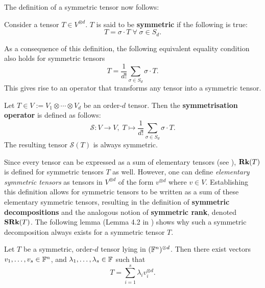 \documentclass[../Lael_John_MasterThesis_Draft.tex]{subfiles}
\begin{document}
The definition of a symmetric tensor now follows: 
\begin{definition}\label{defn:symmetrictensor}
    Consider a tensor $T \in V^{\otimes d}$. $T$ is said to be \textbf{symmetric} if the following is true: \begin{equation}\label{eqn:symmetrictensordefn}
        T = \sigma \cdot T \; \forall \; \sigma \in S_d.
    \end{equation}
\end{definition}
\begin{remark}
    As a consequence of this definition, the following equivalent equality condition also holds for symmetric tensors $$T = \frac{1}{d!} \sum_{\sigma \in S_d} \sigma \cdot T.$$ This gives rise to an operator that transforms any tensor into a symmetric tensor. 
\end{remark}
\begin{definition}\label{defn:symmetrisationoperator}
    Let $T \in V:= V_1 \otimes \cdots \otimes V_d$ be an order-$d$ tensor. Then the \textbf{symmetrisation operator} is defined as follows:
    \begin{equation}\label{eqn:symmetrisationoperatordefn}
        \mathcal{S}: V \to V,\; T \mapsto \frac{1}{d!} \sum_{\sigma \in S_d} \sigma \cdot T.   
    \end{equation} 
    The resulting tensor $\mathcal{S}(T)$ is always symmetric.
\end{definition}
%
Since every tensor can be expressed as a sum of elementary tensors (see ), $\textbf{Rk}(T)$ is defined for symmetric tensors $T$ as well. However, one can define \textit{elementary symmetric tensors} as tensors in $V^{\otimes d}$ of the form $v^{\otimes d}$ where $v \in V$. Establishing this definition allows for symmetric tensors to be written as a sum of these elementary symmetric tensors, resulting in the definition of \textbf{symmetric decompositions} and the analogous notion of \textbf{symmetric rank}, denoted $\textbf{SRk}(T)$. The following lemma (Lemma 4.2 in \cite{comon_symmetric_2008}) shows why such a symmetric decomposition always exists for a symmetric tensor $T$.
\begin{lemma}\label{lemma:symmetricdecompositionexistence}
    Let $T$ be a symmetric, order-$d$ tensor lying in $(\mathbb{F}^n)^{\otimes d}$. Then there exist vectors $v_1, \ldots, v_s \in \mathbb{F}^n$, and $\lambda_1, \ldots, \lambda_s \in \mathbb{F}$ such that 
    \begin{equation}\label{eqn:symmetrictensordecomposition}
        T = \sum_{i=1}^{s} \lambda_iv_i^{\otimes d}.
    \end{equation}
\end{lemma}
\end{document}
